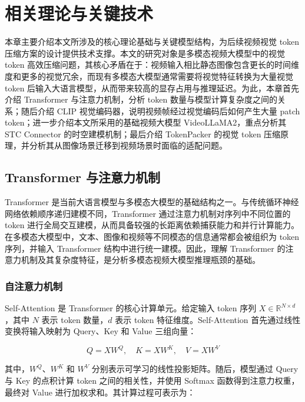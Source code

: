\cleardoublepage

\section{相关理论与关键技术}

本章主要介绍本文所涉及的核心理论基础与关键模型结构，为后续视频视觉 token 压缩方案的设计提供技术支撑。本文的研究对象是多模态视频大模型中的视觉 token 高效压缩问题，其核心矛盾在于：视频输入相比静态图像包含更长的时间维度和更多的视觉冗余，而现有多模态大模型通常需要将视觉特征转换为大量视觉 token 后输入大语言模型，从而带来较高的显存占用与推理延迟。为此，本章首先介绍 Transformer 与注意力机制，分析 token 数量与模型计算复杂度之间的关系；随后介绍 CLIP 视觉编码器，说明视频帧经过视觉编码后如何产生大量 patch token；进一步介绍本文所采用的基础视频大模型 VideoLLaMA2，重点分析其 STC Connector 的时空建模机制；最后介绍 TokenPacker 的视觉 token 压缩原理，并分析其从图像场景迁移到视频场景时面临的适配问题。

\subsection{Transformer 与注意力机制}

Transformer 是当前大语言模型与多模态大模型的基础结构之一。与传统循环神经网络依赖顺序递归建模不同，Transformer 通过注意力机制对序列中不同位置的 token 进行全局交互建模，从而具备较强的长距离依赖捕获能力和并行计算能力\cite{transformer2017}。在多模态大模型中，文本、图像和视频等不同模态的信息通常都会被组织为 token 序列，并输入 Transformer 结构中进行统一建模。因此，理解 Transformer 的注意力机制及其复杂度特征，是分析多模态视频大模型推理瓶颈的基础。

\subsubsection{自注意力机制}

Self-Attention 是 Transformer 的核心计算单元。给定输入 token 序列 $X\in\mathbb{R}^{N\times d}$，其中 $N$ 表示 token 数量，$d$ 表示 token 特征维度。Self-Attention 首先通过线性变换将输入映射为 Query、Key 和 Value 三组向量：

\begin{equation}
    \label{equ:qkv_projection}
    Q=XW^Q,\quad K=XW^K,\quad V=XW^V
\end{equation}

其中，$W^Q$、$W^K$ 和 $W^V$ 分别表示可学习的线性投影矩阵。随后，模型通过 Query 与 Key 的点积计算 token 之间的相关性，并使用 Softmax 函数得到注意力权重，最终对 Value 进行加权求和。其计算过程可表示为：

